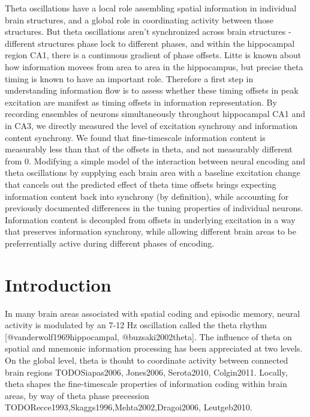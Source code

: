 \documentclass[10pt]{article}
\begin{document}
Theta oscillations have a local role assembling spatial information in individual brain structures, and a global role in coordinating activity between those structures.  But theta oscillations aren't synchronized across brain structures - different structures phase lock to different phases, and within the hippocampal region CA1, there is a continuous gradient of phase offsets.  Litte is known about how information movees from area to area in the hippocampus, but precise theta timing is known to have an important role.  Therefore a first step in understanding information flow is to assess whether these timing offsets in peak excitation are manifest as timing offsets in information representation.  By recording ensembles of neurons simultaneously throughout hippocampal CA1 and in CA3, we directly measured the level of excitation synchrony and information content synchrony.  We found that fine-timescale information content is measurably less than that of the offsets in theta, and not measurably different from 0.  Modifying a simple model of the interaction between neural encoding and theta oscillations by supplying each brain area with a baseline excitation change that cancels out the predicted effect of theta time offsets brings expecting information content back into synchrony (by definition), while accounting for previously documented differences in the tuning properties of individual neurons.  Information content is decoupled from offsets in underlying excitation in a way that preserves information synchrony, while allowing different brain areas to be preferrentially active during different phases of encoding.

\section*{Introduction}
In many brain areas associated with spatial coding and episodic memory, neural activity is modulated by an 7-12 Hz oscillation called the theta rhythm [@vanderwolf1969hippocampal,  @buzsaki2002theta].  The influence of theta on spatial and mnemonic information processing has been appreciated at two levels. On the global level, theta is thouht to coordinate activity between connected brain regions TODO{Siapas2006, Jones2006, Serota2010, Colgin2011}. Locally, theta shapes the fine-timescale properties of information coding within brain areas, by way of theta phase precession TODO{Recce1993,Skaggs1996,Mehta2002,Dragoi2006, Leutgeb2010}.
\end{document}
